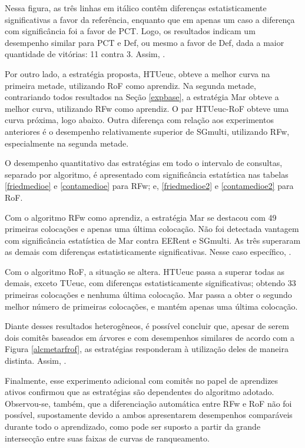 Nessa figura, as três linhas em itálico contêm diferenças estatisticamente significativas a favor da referência, enquanto que em apenas um caso a diferença com significância foi a favor de PCT.
Logo, os resultados indicam um desempenho similar para PCT e Def, ou mesmo a favor de Def, dada a maior quantidade de vitórias: 11 contra 3.
Assim, .

Por outro lado, a estratégia proposta, HTUeuc, obteve a melhor curva na primeira metade, utilizando RoF como aprendiz.
Na segunda metade, contrariando todos resultados na Seção \ref{expbase}, a estratégia Mar obteve a melhor curva, utilizando RFw como aprendiz.
O par HTUeuc-RoF obteve uma curva próxima, logo abaixo.
Outra diferença com relação aos experimentos anteriores é o desempenho relativamente superior de SGmulti, utilizando RFw, especialmente na segunda metade.

O desempenho quantitativo das estratégias em todo o intervalo de consultas, separado por algoritmo, é apresentado com significância estatística nas tabelas \ref{friedmedioe} e \ref{contamedioe} para RFw; e, \ref{friedmedioe2} e \ref{contamedioe2} para RoF.


Com o algoritmo RFw como aprendiz, a estratégia Mar se destacou com 49 primeiras colocações e apenas uma última colocação.
Não foi detectada vantagem com significância estatística de Mar contra EERent e SGmulti.
As três superaram as demais com diferenças estatisticamente significativas.
Nesse caso específico, .

Com o algoritmo RoF, a situação se altera.
HTUeuc passa a superar todas as demais, exceto TUeuc, com diferenças estatisticamente significativas; obtendo 33 primeiras colocações e nenhuma última colocação.
Mar passa a obter o segundo melhor número de primeiras colocações, e mantém apenas uma última colocação.

Diante desses resultados heterogêneos, é possível concluir que, apesar de serem dois comitês baseados em árvores e com desempenhos similares de acordo com a Figura \ref{alcmetarfrof}, as estratégias responderam à utilização deles de maneira distinta.
Assim, .

Finalmente, esse experimento adicional com comitês no papel de aprendizes ativos confirmou que as estratégias são dependentes do algoritmo adotado.
Observou-se, também, que a diferenciação automática entre RFw e RoF não foi possível, supostamente devido a ambos apresentarem desempenhos comparáveis durante todo o aprendizado, como pode ser suposto a partir da grande intersecção entre suas faixas de curvas de ranqueamento.